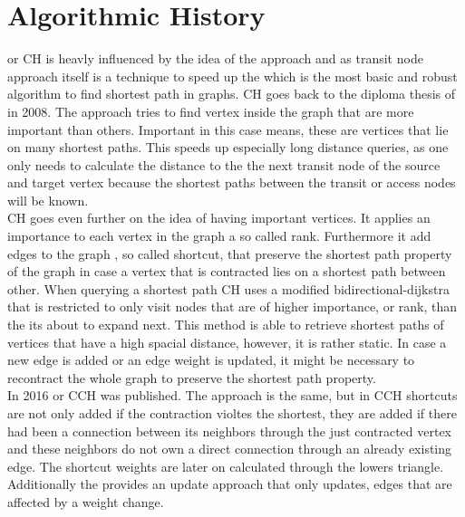 \documentclass[11pt, rgb]{scrreprt}
\begin{document}
\section[Algorithmic History]{Algorithmic History} \label{sec:algorithmic_history}

\cite[Contraction Hierarchies]{Geisberger_2012} or CH is heavly influenced by the idea of the \cite[Transit-Node]{Bast_2007} approach and as transit node approach itself is a
technique to speed up the \cite[Dijkstra Algorithm]{Dijkstra_1959} which is the most basic and robust algorithm to find shortest path in graphs. CH goes back to the diploma thesis of \cite[Geisberger]{Geisberger} in 2008. The \cite[Transit-Node]{Bast_2007} approach
tries to find vertex inside the graph that are more important than others. Important in this case means, these are vertices that lie on many shortest paths. This speeds up 
especially long distance queries, as one only needs to calculate the distance to the the next transit node of the source and target vertex because the shortest paths between 
the transit or access nodes will be known. \\ 
CH goes even further on the idea of having important vertices. It applies an importance to each vertex in the graph a so called rank. Furthermore it add edges to the graph
, so called shortcut, that preserve the shortest path property of the graph in case a vertex that is contracted lies on a shortest path between other. When querying a shortest
path CH uses a modified bidirectional-dijkstra that is restricted to only visit nodes that are of higher importance, or rank, than the its about to expand next.
This method is able to retrieve shortest paths of vertices that have a high spacial distance, however, it is rather static. In case a new edge is added or an edge weight is updated, 
it might be necessary to recontract the whole graph to preserve the shortest path property. \\
In 2016 \cite[Customization Contraction Hierarchies]{CCH} or CCH was published. The approach is the same, but in CCH shortcuts are not only added if the contraction violtes the shortest,
they are added if there had been a connection between its neighbors through the just contracted vertex and these neighbors do not own a direct connection through an already existing edge.
The shortcut weights are later on calculated through the lowers triangle. Additionally the \cite[Customization Contraction Hierarchies]{CCH} provides an update approach that only updates,
edges that are affected by a weight change.
\end{document}
